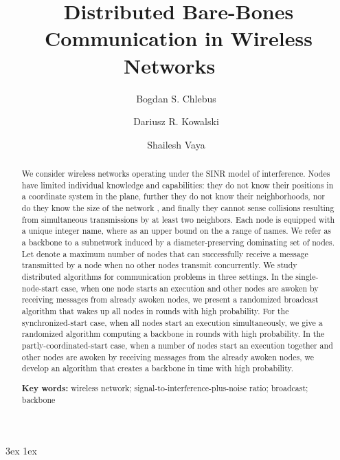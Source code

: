 \documentclass[11pt]{article}
\begin{document}
\baselineskip 	3ex
\parskip 		1ex

\title{Distributed Bare-Bones Communication in Wireless Networks \footnotemark[1]~\vfill}


\author{	Bogdan S. Chlebus~\footnotemark[2] \and
		Dariusz R. Kowalski~\footnotemark[3] \and
		Shailesh Vaya~\footnotemark[4]}


			


\date{}


\maketitle

\vfill



\begin{abstract}
We consider wireless networks operating under the SINR model of interference.
Nodes have limited individual knowledge and capabilities: 
they do not know their positions in a coordinate system  in the plane, 
further they do not know their neighborhoods, 
nor do they know the size of the network , 
and finally they  cannot sense collisions resulting from simultaneous transmissions by
at least two neighbors.
Each node is equipped with a unique integer name, where  as an upper bound on the a range of names. 
We refer  as a  backbone to a subnetwork induced by a diameter-preserving dominating set of nodes. 
Let   denote a maximum number of nodes that can successfully receive a message transmitted by a node when no other nodes transmit concurrently.
We study distributed algorithms for  communication problems in three settings. 
In the single-node-start case, when one node starts an execution and other nodes are awoken by receiving messages from already awoken nodes, we present a randomized broadcast algorithm that wakes up all nodes in   rounds with high probability. 
For the synchronized-start case, when all nodes start an execution simultaneously, we give a randomized algorithm  computing a backbone in  rounds with high probability.
In the partly-coordinated-start case, when a number of nodes start an execution together and other nodes are awoken by receiving messages from the already awoken nodes, we develop an algorithm that creates a backbone in time  with high probability.

\vfill


\noindent 
\textbf{Key words:} 
wireless network; 
signal-to-interference-plus-noise ratio; 
broadcast;
backbone
\end{abstract}
\end{document}
